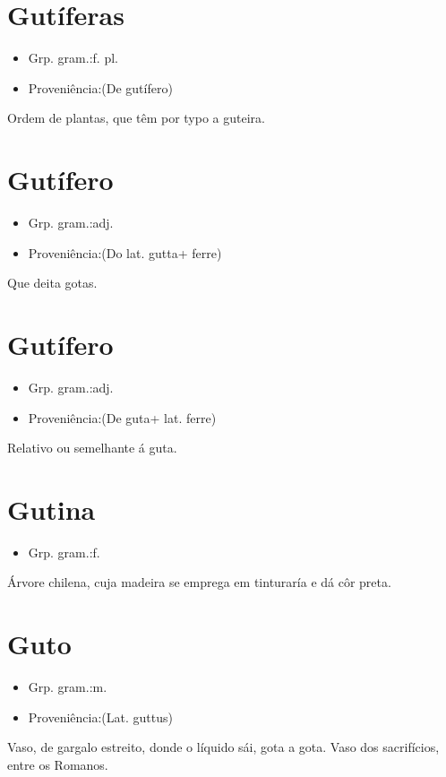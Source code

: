 \section{Gutíferas}
\begin{itemize}
\item {Grp. gram.:f. pl.}
\end{itemize}
\begin{itemize}
\item {Proveniência:(De \textunderscore gutífero\textunderscore )}
\end{itemize}
Ordem de plantas, que têm por typo a guteira.
\section{Gutífero}
\begin{itemize}
\item {Grp. gram.:adj.}
\end{itemize}
\begin{itemize}
\item {Proveniência:(Do lat. \textunderscore gutta\textunderscore  + \textunderscore ferre\textunderscore )}
\end{itemize}
Que deita gotas.
\section{Gutífero}
\begin{itemize}
\item {Grp. gram.:adj.}
\end{itemize}
\begin{itemize}
\item {Proveniência:(De \textunderscore guta\textunderscore  + lat. \textunderscore ferre\textunderscore )}
\end{itemize}
Relativo ou semelhante á guta.
\section{Gutina}
\begin{itemize}
\item {Grp. gram.:f.}
\end{itemize}
Árvore chilena, cuja madeira se emprega em tinturaría e dá côr preta.
\section{Guto}
\begin{itemize}
\item {Grp. gram.:m.}
\end{itemize}
\begin{itemize}
\item {Proveniência:(Lat. \textunderscore guttus\textunderscore )}
\end{itemize}
Vaso, de gargalo estreito, donde o líquido sái, gota a gota.
Vaso dos sacrifícios, entre os Romanos.
